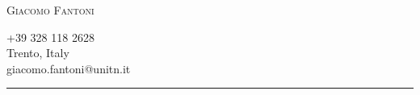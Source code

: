 \documentclass[11pt, a4paper, roman]{letter}
\begin{document}
\pagestyle{empty}
\raggedbottom

\begin{minipage}[t]{0.5\textwidth}
    \vspace*{\fill}
    \textsc{{\Huge Giacomo Fantoni}} %
    \vspace*{\fill}
\end{minipage}\hfill
\begin{minipage}[t]{0.3\textwidth}
    \setlength{\baselineskip}{15pt}
    \RaggedLeft
    \faMobile{} +39 328 118 2628\\
    \faHome{} Trento, Italy\\
    \faEnvelope {} giacomo.fantoni@unitn.it\\
\end{minipage}

{\color{cvteal} \rule{\linewidth}{1mm}}
\end{document}
